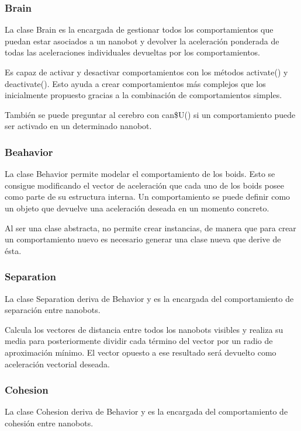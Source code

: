 \subsubsection{Brain}
\label{sec:brain}
La clase Brain es la encargada de gestionar todos los comportamientos que puedan estar asociados a un nanobot y devolver la aceleración ponderada de todas las aceleraciones individuales devueltas por los comportamientos.

Es capaz de activar y desactivar comportamientos con los métodos activate() y deactivate(). Esto ayuda a crear comportamientos más complejos que los inicialmente propuesto gracias a la combinación de comportamientos simples.

También se puede preguntar al cerebro con can\$U() si un comportamiento puede ser activado en un determinado nanobot.

\subsubsection{Beahavior}
\label{sec:beahavior}
La clase Behavior permite modelar el comportamiento de los boids. Esto se consigue modificando el vector de aceleración que cada uno de los boids posee como parte de su estructura interna. Un comportamiento se puede definir como un objeto que devuelve una aceleración deseada en un momento concreto.

Al ser una clase abstracta, no permite crear instancias, de manera que para crear un comportamiento nuevo es necesario generar una clase nueva que derive de ésta.

\subsubsection{Separation}
\label{sec:separation}
La clase Separation deriva de Behavior y es la encargada del comportamiento de separación entre nanobots.

Calcula  los vectores de distancia entre todos los nanobots visibles y realiza su media para posteriormente dividir cada término del vector por un radio de aproximación mínimo. El vector opuesto a ese resultado será devuelto como aceleración vectorial deseada.

\subsubsection{Cohesion}
\label{sec:cohesion}
La clase Cohesion deriva de Behavior y es la encargada del comportamiento de cohesión entre nanobots.

